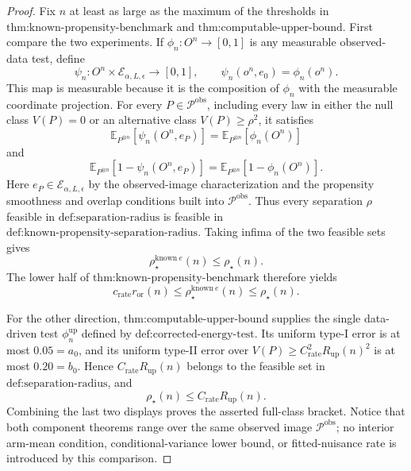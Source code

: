 \documentclass{article}
\begin{document}
\begin{proof}
Fix \(n\) at least as large as the maximum of the thresholds in \(\text{thm:known-propensity-benchmark}\) and \(\text{thm:computable-upper-bound}\).  First compare the two experiments.  If \(\phi_n:O^n\to[0,1]\) is any measurable observed-data test, define
\[
 \psi_n:O^n\times\mathcal E_{\alpha,L,\epsilon}\longrightarrow[0,1],
 \qquad
 \psi_n(o^n,e_0)=\phi_n(o^n).
\]
This map is measurable because it is the composition of \(\phi_n\) with the measurable coordinate projection.  For every \(P\in\mathcal P^{\mathrm{obs}}\), including every law in either the null class \(V(P)=0\) or an alternative class \(V(P)\ge\rho^2\), it satisfies
\[
 \mathbb E_{P^{\otimes n}}\!\left[\psi_n(O^n,e_P)\right]
 =\mathbb E_{P^{\otimes n}}\!\left[\phi_n(O^n)\right]
\]
and
\[
 \mathbb E_{P^{\otimes n}}\!\left[1-\psi_n(O^n,e_P)\right]
 =\mathbb E_{P^{\otimes n}}\!\left[1-\phi_n(O^n)\right].
\]
Here \(e_P\in\mathcal E_{\alpha,L,\epsilon}\) by the observed-image characterization and the propensity smoothness and overlap conditions built into \(\mathcal P^{\mathrm{obs}}\).  Thus every separation \(\rho\) feasible in \(\text{def:separation-radius}\) is feasible in \(\text{def:known-propensity-separation-radius}\).  Taking infima of the two feasible sets gives
\[
 \rho_\star^{\mathrm{known}\ e}(n)\le \rho_\star(n).
\]
The lower half of \(\text{thm:known-propensity-benchmark}\) therefore yields
\[
 c_{\mathrm{rate}}r_{\mathrm{or}}(n)
 \le \rho_\star^{\mathrm{known}\ e}(n)
 \le \rho_\star(n).
\]

For the other direction, \(\text{thm:computable-upper-bound}\) supplies the single data-driven test \(\phi_n^{\mathrm{up}}\) defined by \(\text{def:corrected-energy-test}\).  Its uniform type-I error is at most \(0.05=a_0\), and its uniform type-II error over \(V(P)\ge C_{\mathrm{rate}}^2R_{\mathrm{up}}(n)^2\) is at most \(0.20=b_0\).  Hence \(C_{\mathrm{rate}}R_{\mathrm{up}}(n)\) belongs to the feasible set in \(\text{def:separation-radius}\), and
\[
 \rho_\star(n)\le C_{\mathrm{rate}}R_{\mathrm{up}}(n).
\]
Combining the last two displays proves the asserted full-class bracket.  Notice that both component theorems range over the same observed image \(\mathcal P^{\mathrm{obs}}\); no interior arm-mean condition, conditional-variance lower bound, or fitted-nuisance rate is introduced by this comparison.


\end{proof}
\end{document}
